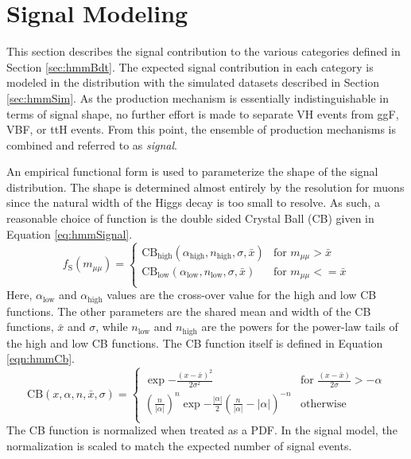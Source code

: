 \section{Signal Modeling}\label{sec:hmmSig}

This section describes the signal contribution to the various categories defined in Section \ref{sec:hmmBdt}.
The expected signal contribution in each category is modeled in the \muu distribution with the simulated datasets described in Section \ref{sec:hmmSim}.
As the production mechanism is essentially indistinguishable in terms of signal shape, no further effort is made to separate VH events from ggF, VBF, or ttH events.
From this point, the ensemble of production mechanisms is combined and referred to as \emph{signal}.

An empirical functional form is used to parameterize the shape of the signal distribution.
The shape is determined almost entirely by the \pt resolution for muons since the natural width of the Higgs decay is too small to resolve.
As such, a reasonable choice of function is the double sided Crystal Ball (CB) given in Equation \ref{eq:hmmSignal}.
\begin{equation}\label{eq:hmmSignal}
  f_\text{S}(m_{\mu\mu}) =
  \begin{cases}
  \text{CB}_\text{high}(\alpha_\text{high},n_\text{high},\sigma,\bar{x}) & \text{for }m_{\mu\mu}>\bar{x}\\
  \text{CB}_\text{low}(\alpha_\text{low},n_\text{low},\sigma,\bar{x}) & \text{for }m_{\mu\mu}<=\bar{x}\\
  \end{cases}
\end{equation}
Here, $\alpha_\text{low}$ and $\alpha_\text{high}$ values are the cross-over value for the high and low CB functions.
The other parameters are the shared mean and width of the CB functions, $\bar{x}$ and $\sigma$,
while $n_\text{low}$ and $n_\text{high}$ are the powers for the power-law tails of the high and low CB functions.
The CB function itself is defined in Equation \ref{eqn:hmmCb}.
\begin{equation}\label{eqn:hmmCb}
    \text{CB}(x,\alpha,n,\bar{x},\sigma) = 
    \begin{cases}
        \exp{-\frac{(x-\bar{x})^2}{2\sigma^2}} & \text{for }\frac{(x-\bar{x})}{2\sigma}>-\alpha \\
        \left(\frac{n}{|\alpha|}\right)^n \exp{-\frac{|\alpha|}{2}} \left(\frac{n}{|\alpha|}-|\alpha|\right)^{-n} & \text{otherwise}\\
    \end{cases}
\end{equation}
The CB function is normalized when treated as a PDF.
In the signal model, the normalization is scaled to match the expected number of signal events.

